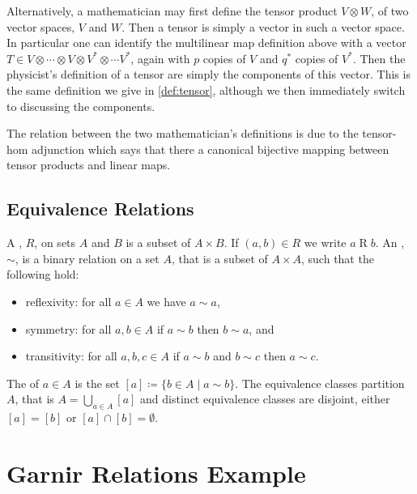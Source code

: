 \documentclass[fleqn]{NotesClass}
\begin{document}
\begin{appendices}
        Alternatively, a mathematician may first define the tensor product \(V \otimes W\), of two vector spaces, \(V\) and \(W\).
        Then a tensor is simply a vector in such a vector space.
        In particular one can identify the multilinear map definition above with a vector \(T \in V \otimes \dotsb \otimes V \otimes V^* \otimes \dotsm V^*\), again with \(p\) copies of \(V\) and \(q^*\) copies of \(V^*\).
        Then the physicist's definition of a tensor are simply the components of this vector.
        This is the same definition we give in \cref{def:tensor}, although we then immediately switch to discussing the components.
        
        The relation between the two mathematician's definitions is due to the tensor-hom adjunction which says that there a canonical bijective mapping between tensor products and linear maps.
        
        \section{Equivalence Relations}\label{sec:equivalence relations}
        A , \(R\), on sets \(A\) and \(B\) is a subset of \(A \times B\).
        If \((a, b) \in R\) we write \(a \mathbin{R} b\).
        An , \(\sim\), is a binary relation on a set \(A\), that is a subset of \(A \times A\), such that the following hold:
        \begin{itemize}
            \item reflexivity: for all \(a \in A\) we have \(a \sim a\),
            \item symmetry: for all \(a, b \in A\) if \(a \sim b\) then \(b \sim a\), and
            \item transitivity: for all \(a, b, c \in A\) if \(a \sim b\) and \(b \sim c\) then \(a \sim c\).
        \end{itemize}
        
        The  of \(a \in A\) is the set \([a] \coloneqq \{b \in A \mid a \sim b\}\).
        The equivalence classes partition \(A\), that is \(A = \bigcup_{a \in A} [a]\) and distinct equivalence classes are disjoint, either \([a] = [b]\) or \([a] \cap [b] = \emptyset\).
        
        \chapter{Garnir Relations Example}\label{app:garnir example}

\end{appendices}
\end{document}
